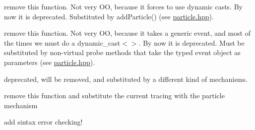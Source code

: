 
\begin{DoxyRefList}
\item[\label{todo__todo000002}%
\hypertarget{todo__todo000002}{}%
Global \hyperlink{group__metasim__stat_gaf5584d4aefc280eb644997fd13f8cd3d}{Meta\+Sim\+:\+:Base\+Stat\+:\+:attach} (\hyperlink{classMetaSim_1_1Entity}{Entity} $\ast$e)]remove this function. Not very OO, because it forces to use dynamic casts. By now it is deprecated. Substituted by add\+Particle() (see \hyperlink{particle_8hpp_source}{particle.\+hpp}).  
\item[\label{todo__todo000001}%
\hypertarget{todo__todo000001}{}%
Global \hyperlink{group__metasim__stat_ga26159e56ee45dc6d8e1413bf7e54ecbe}{Meta\+Sim\+:\+:Base\+Stat\+:\+:probe} (\hyperlink{classMetaSim_1_1Event}{Event} $\ast$e)]remove this function. Not very OO, because it takes a generic event, and most of the times we must do a dynamic\+\_\+cast$<$$>$. By now it is deprecated. Must be substituted by non-\/virtual probe methods that take the typed event object as parameters (see \hyperlink{particle_8hpp_source}{particle.\+hpp}).  
\item[\label{todo__todo000004}%
\hypertarget{todo__todo000004}{}%
Global \hyperlink{classMetaSim_1_1Event_a03151f618312378f65fe0b96a63dc4c9}{Meta\+Sim\+:\+:Event\+:\+:add\+Stat} (\hyperlink{classMetaSim_1_1BaseStat}{Base\+Stat} $\ast$act\+Stat)]deprecated, will be removed, and substituted by a different kind of mechanisms.  
\item[\label{todo__todo000006}%
\hypertarget{todo__todo000006}{}%
Global \hyperlink{classMetaSim_1_1Trace_a4284196f04d6639f4bb9bb2fc7662ea6}{Meta\+Sim\+:\+:Trace\+:\+:record} (\hyperlink{classMetaSim_1_1Event}{Event} $\ast$)]remove this function and substitute the current tracing with the particle mechanism  
\item[\label{todo__todo000005}%
\hypertarget{todo__todo000005}{}%
Global \hyperlink{namespaceparse__util_a14526fd1fe35767507f2c20ac147ade3}{parse\+\_\+util\+:\+:split\+\_\+instr} (const string \&code)]add sintax error checking! 
\end{DoxyRefList}